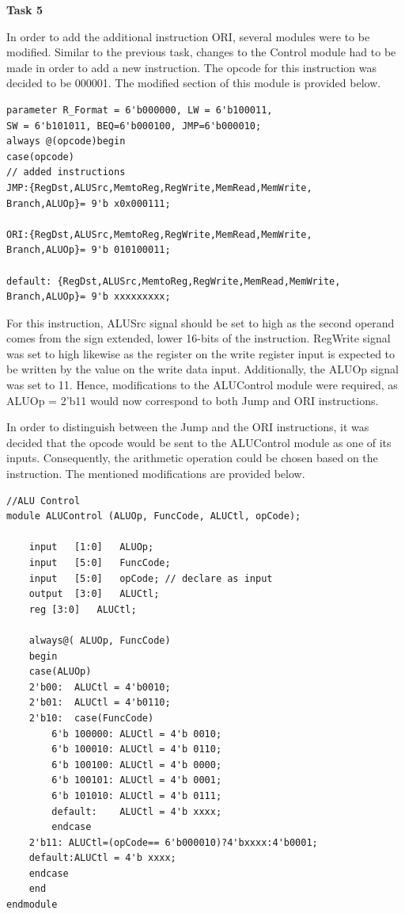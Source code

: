 \documentclass[12pt,a4paper]{article}
\begin{document}
	\vspace{0.4cm}
	\noindent \textbf{\large Task 5}
	\vspace{0.2cm}
	
	\noindent In order to add the additional instruction ORI, several modules were to be modified. Similar to the previous task, changes to the Control module had to be made in order to add a new instruction. The opcode for this instruction was decided to be 000001. The modified section of this module is provided below.
	
	\begin{lstlisting}[style={verilog-style}]
parameter R_Format = 6'b000000, LW = 6'b100011, 
SW = 6'b101011, BEQ=6'b000100, JMP=6'b000010;
always @(opcode)begin
case(opcode)
// added instructions
JMP:{RegDst,ALUSrc,MemtoReg,RegWrite,MemRead,MemWrite,
Branch,ALUOp}= 9'b x0x000111;

ORI:{RegDst,ALUSrc,MemtoReg,RegWrite,MemRead,MemWrite,
Branch,ALUOp}= 9'b 010100011;

default: {RegDst,ALUSrc,MemtoReg,RegWrite,MemRead,MemWrite,
Branch,ALUOp}= 9'b xxxxxxxxx;
\end{lstlisting}
	
	\noindent For this instruction, ALUSrc signal should be set to high as the second operand comes from the sign extended, lower 16-bits of the instruction. RegWrite signal was set to high likewise as the register on the write register input is expected to be written by the value on the write data input. Additionally, the ALUOp signal was set to 11. Hence, modifications to the ALUControl module were required, as ALUOp = 2'b11 would now correspond to both Jump and ORI instructions. 
	
	\vspace{0.1cm}
	\noindent In order to distinguish between the Jump and the ORI instructions, it was decided that the opcode would be sent to the ALUControl module as one of its inputs. Consequently, the arithmetic operation could be chosen based on the instruction. The mentioned modifications are provided below.
	
	\begin{lstlisting}[style={verilog-style}]
//ALU Control 
module ALUControl (ALUOp, FuncCode, ALUCtl, opCode);

	input 	[1:0] 	ALUOp;
	input 	[5:0] 	FuncCode;
	input 	[5:0] 	opCode; // declare as input
	output	[3:0]	ALUCtl;
	reg	[3:0]	ALUCtl;
	
	always@( ALUOp, FuncCode)
	begin
	case(ALUOp)
	2'b00:	ALUCtl = 4'b0010;
	2'b01:	ALUCtl = 4'b0110;
	2'b10:	case(FuncCode)
		6'b 100000: ALUCtl = 4'b 0010;
		6'b 100010: ALUCtl = 4'b 0110;
		6'b 100100: ALUCtl = 4'b 0000;
		6'b 100101: ALUCtl = 4'b 0001;
		6'b 101010: ALUCtl = 4'b 0111;
		default:	ALUCtl = 4'b xxxx;
		endcase
	2'b11: ALUCtl=(opCode== 6'b000010)?4'bxxxx:4'b0001;
	default:ALUCtl = 4'b xxxx;
	endcase
	end
endmodule
	\end{lstlisting}
	
\end{document}

